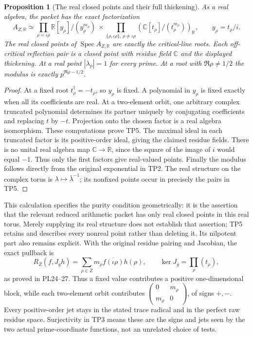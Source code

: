 \documentclass[11pt,a4paper]{article}
\newtheorem{proposition}[theorem]{Proposition}
\theoremstyle{definition}\newtheorem{definition}[theorem]{Definition}
\newcommand{\C}{\mathbb C}\newcommand{\R}{\mathbb R}
\newcommand{\Spec}{\operatorname{Spec}}\newcommand{\SpecMon}{\operatorname{Spec}_{\mathrm{mon}}}
\begin{document}
\begin{proposition}[The real closed points and their full thickening]
As a real algebra, the packet has the exact factorization
\[
 A_{Z,\R}\simeq
 \prod_{\rho=\iota\rho}\R[y_\rho]/(y_\rho^{m_\rho})
 \ \times\!
 \prod_{\{\rho,\iota\rho\},\,\rho\ne\iota\rho}
       (\C[t_\rho]/(t_\rho^{m_\rho}))_{\R},
 \qquad y_\rho=t_\rho/i.
 \tag{TP5}\label{tp:real-factors}
\]
The real closed points of $\Spec A_{Z,\R}$ are exactly the
critical-line roots. Each off-critical reflection pair is a
closed point with residue field $\C$ and the displayed thickening.
At a real point $|\lambda_p|=1$ for every prime. At a root with
$\Re\rho\ne1/2$ the modulus is exactly $p^{\Re\rho-1/2}$.
\end{proposition}
\begin{proof}
At a fixed root $t_\rho^\dagger=-t_\rho$, so $y_\rho$ is
fixed. A polynomial in $y_\rho$ is fixed exactly when all its
coefficients are real. At a two-element orbit, one arbitrary
complex truncated polynomial determines its partner uniquely by
conjugating coefficients and replacing $t$ by $-t$. Projection
onto the chosen factor is a real algebra isomorphism. These
computations prove TP5. The maximal ideal in each truncated
factor is its positive-order ideal, giving the claimed residue
fields. There is no unital real algebra map $\C\to\R$, since
the square of the image of $i$ would equal $-1$. Thus only the
first factors give real-valued points. Finally the modulus follows
directly from the original exponential in TP2. The real structure
on the complex torus is $\lambda\mapsto\bar\lambda^{-1}$;
its nonfixed points occur in precisely the pairs in TP5.
\end{proof}

This calculation specifies the purity condition geometrically:
it is the assertion that the relevant reduced arithmetic packet
has only real closed points in this real torus. Merely supplying
its real structure does not establish that assertion; TP5 retains
and describes every nonreal point rather than deleting it.
Its nilpotent part also remains explicit. With the original
residue pairing and Jacobian, the exact pullback is
\[
 R_Z(f,J_g h)=
 \sum_{\rho\in Z}m_\rho\overline{f(\iota\rho)}h(\rho),
 \qquad \ker J_g=\prod_\rho(t_\rho),
 \tag{TP6}\label{tp:trace}
\]
as proved in PL24--27. Thus a fixed value contributes a positive
one-dimensional block, while each two-element orbit contributes
$\left(\begin{smallmatrix}0&m_\rho\\m_\rho&0\end{smallmatrix}\right)$,
of signs $+,-$. Every positive-order jet stays in the stated
trace radical and in the perfect raw residue space. Surjectivity
in TP3 means these are the signs and jets seen by the two actual
prime-coordinate functions, not an unrelated choice of tests.
\end{document}
